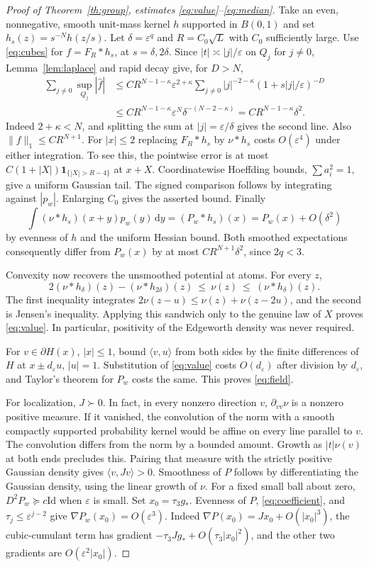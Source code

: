 \documentclass[10pt,letterpaper]{article}
\newcommand{\ip}[2]{\langle #1,#2\rangle}
\newcommand{\norm}[1]{\lVert#1\rVert}
\newcommand{\id}{\mathrm{Id}}
\newcommand{\eps}{\varepsilon}
\newcommand{\gstar}{g_{\!*}}
\newcommand{\dd}{\,\mathrm d}
\begin{document}
\begin{proof}[Proof of Theorem~\ref{th:group}, estimates \eqref{eq:value}--\eqref{eq:median}]
Take an even, nonnegative, smooth unit-mass kernel $h$ supported in $B(0,1)$ and set $h_s(z)=s^{-N}h(z/s)$. Let $\delta=\eps^q$ and $R=C_0\sqrt L$ with $C_0$ sufficiently large. Use \eqref{eq:cubes} for $f=F_R*h_s$, at $s=\delta,2\delta$. Since $|t|\asymp |j|/\eps$ on $Q_j$ for $j\ne0$, Lemma~\ref{lem:laplace} and rapid decay give, for $D>N$,
\begin{align*}
 \sum_{j\ne0}\sup_{Q_j}|\widehat f|
 &\le C R^{N-1-\kappa}\eps^{2+\kappa}
  \sum_{j\ne0}|j|^{-2-\kappa}(1+s|j|/\eps)^{-D}\\
 &\le C R^{N-1-\kappa}\eps^N\delta^{-(N-2-\kappa)}
 = C R^{N-1-\kappa}\delta^2 .
\end{align*}
Indeed $2+\kappa<N$, and splitting the sum at $|j|=\eps/\delta$ gives the second line. Also $\norm f_1\le C R^{N+1}$. For $|x|\le2$ replacing $F_R*h_s$ by $\nu*h_s$ costs $O(\eps^4)$ under either integration. To see this, the pointwise error is at most $C(1+|X|)\mathbf1_{\{|X|>R-4\}}$ at $x+X$. Coordinatewise Hoeffding bounds, $\sum a_i^2=1$, give a uniform Gaussian tail. The signed comparison follows by integrating against $|p_w|$. Enlarging $C_0$ gives the asserted bound. Finally
\[
 \int (\nu*h_s)(x+y)p_w(y)\dd y=(P_w*h_s)(x)
 =P_w(x)+O(\delta^2)
\]
by evenness of $h$ and the uniform Hessian bound. Both smoothed expectations consequently differ from $P_w(x)$ by at most $C R^{N+1}\delta^2$, since $2q<3$.

Convexity now recovers the unsmoothed potential at atoms. For every $z$,
\[
 2(\nu*h_\delta)(z)-(\nu*h_{2\delta})(z)
 \ \le\ \nu(z)\ \le\ (\nu*h_\delta)(z).
\]
The first inequality integrates $2\nu(z-u)\le\nu(z)+\nu(z-2u)$, and the second is Jensen's inequality. Applying this sandwich only to the genuine law of $X$ proves \eqref{eq:value}. In particular, positivity of the Edgeworth density was never required.

For $v\in\partial H(x)$, $|x|\le1$, bound $\ip vu$ from both sides by the finite differences of $H$ at $x\pm d_\eps u$, $|u|=1$. Substitution of \eqref{eq:value} costs $O(d_\eps)$ after division by $d_\eps$, and Taylor's theorem for $P_w$ costs the same. This proves \eqref{eq:field}.

For localization, $J\succ0$. In fact, in every nonzero direction $v$, $\partial_{vv}\nu$ is a nonzero positive measure. If it vanished, the convolution of the norm with a smooth compactly supported probability kernel would be affine on every line parallel to $v$. The convolution differs from the norm by a bounded amount. Growth as $|t|\nu(v)$ at both ends precludes this. Pairing that measure with the strictly positive Gaussian density gives $\ip v{Jv}>0$. Smoothness of $P$ follows by differentiating the Gaussian density, using the linear growth of $\nu$. For a fixed small ball about zero, $D^2P_w\succeq c\id$ when $\eps$ is small. Set $x_0=\tau_3\gstar$. Evenness of $P$, \eqref{eq:coefficient}, and $\tau_j\le\eps^{j-2}$ give $\nabla P_w(x_0)=O(\eps^3)$. Indeed $\nabla P(x_0)=Jx_0+O(|x_0|^3)$, the cubic-cumulant term has gradient $-\tau_3J\gstar+O(\tau_3|x_0|^2)$, and the other two gradients are $O(\eps^2|x_0|)$.


\end{proof}
\end{document}
